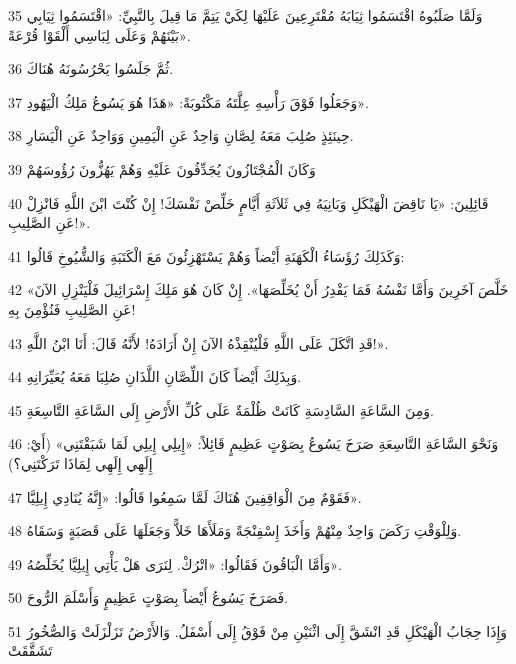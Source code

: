 \par 35 وَلَمَّا صَلَبُوهُ اقْتَسَمُوا ثِيَابَهُ مُقْتَرِعِينَ عَلَيْهَا لِكَيْ يَتِمَّ مَا قِيلَ بِالنَّبِيِّ: «اقْتَسَمُوا ثِيَابِي بَيْنَهُمْ وَعَلَى لِبَاسِي أَلْقَوْا قُرْعَةً».
\par 36 ثُمَّ جَلَسُوا يَحْرُسُونَهُ هُنَاكَ.
\par 37 وَجَعَلُوا فَوْقَ رَأْسِهِ عِلَّتَهُ مَكْتُوبَةً: «هَذَا هُوَ يَسُوعُ مَلِكُ الْيَهُودِ».
\par 38 حِينَئِذٍ صُلِبَ مَعَهُ لِصَّانِ وَاحِدٌ عَنِ الْيَمِينِ وَوَاحِدٌ عَنِ الْيَسَارِ.
\par 39 وَكَانَ الْمُجْتَازُونَ يُجَدِّفُونَ عَلَيْهِ وَهُمْ يَهُزُّونَ رُؤُوسَهُمْ
\par 40 قَائِلِينَ: «يَا نَاقِضَ الْهَيْكَلِ وَبَانِيَهُ فِي ثَلاَثَةِ أَيَّامٍ خَلِّصْ نَفْسَكَ! إِنْ كُنْتَ ابْنَ اللَّهِ فَانْزِلْ عَنِ الصَّلِيبِ!».
\par 41 وَكَذَلِكَ رُؤَسَاءُ الْكَهَنَةِ أَيْضاً وَهُمْ يَسْتَهْزِئُونَ مَعَ الْكَتَبَةِ وَالشُّيُوخِ قَالُوا:
\par 42 «خَلَّصَ آخَرِينَ وَأَمَّا نَفْسُهُ فَمَا يَقْدِرُ أَنْ يُخَلِّصَهَا». إِنْ كَانَ هُوَ مَلِكَ إِسْرَائِيلَ فَلْيَنْزِلِ الآنَ عَنِ الصَّلِيبِ فَنُؤْمِنَ بِهِ!
\par 43 قَدِ اتَّكَلَ عَلَى اللَّهِ فَلْيُنْقِذْهُ الآنَ إِنْ أَرَادَهُ! لأَنَّهُ قَالَ: أَنَا ابْنُ اللَّهِ!».
\par 44 وَبِذَلِكَ أَيْضاً كَانَ اللِّصَّانِ اللَّذَانِ صُلِبَا مَعَهُ يُعَيِّرَانِهِ.
\par 45 وَمِنَ السَّاعَةِ السَّادِسَةِ كَانَتْ ظُلْمَةٌ عَلَى كُلِّ الأَرْضِ إِلَى السَّاعَةِ التَّاسِعَةِ.
\par 46 وَنَحْوَ السَّاعَةِ التَّاسِعَةِ صَرَخَ يَسُوعُ بِصَوْتٍ عَظِيمٍ قَائِلاً: «إِيلِي إِيلِي لَمَا شَبَقْتَنِي» (أَيْ: إِلَهِي إِلَهِي لِمَاذَا تَرَكْتَنِي؟)
\par 47 فَقَوْمٌ مِنَ الْوَاقِفِينَ هُنَاكَ لَمَّا سَمِعُوا قَالُوا: «إِنَّهُ يُنَادِي إِيلِيَّا».
\par 48 وَلِلْوَقْتِ رَكَضَ وَاحِدٌ مِنْهُمْ وَأَخَذَ إِسْفِنْجَةً وَمَلَأَهَا خَلاًّ وَجَعَلَهَا عَلَى قَصَبَةٍ وَسَقَاهُ.
\par 49 وَأَمَّا الْبَاقُونَ فَقَالُوا: «اتْرُكْ. لِنَرَى هَلْ يَأْتِي إِيلِيَّا يُخَلِّصُهُ».
\par 50 فَصَرَخَ يَسُوعُ أَيْضاً بِصَوْتٍ عَظِيمٍ وَأَسْلَمَ الرُّوحَ.
\par 51 وَإِذَا حِجَابُ الْهَيْكَلِ قَدِ انْشَقَّ إِلَى اثْنَيْنِ مِنْ فَوْقُ إِلَى أَسْفَلُ. وَالأَرْضُ تَزَلْزَلَتْ وَالصُّخُورُ تَشَقَّقَتْ
